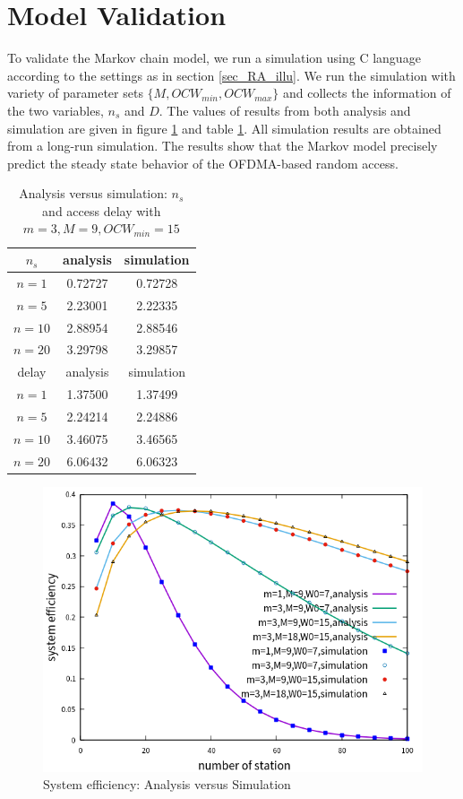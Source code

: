 \section{Model Validation} 		\label{sec_model_val}
To validate the Markov chain model, we run a simulation using C language according to the settings as in section \ref{sec_RA_illu}. 
We run the simulation with variety of parameter sets $\lbrace M, OCW_{min}, OCW_{max}\rbrace$ and collects the information of the two variables, $n_s$ and $D$. 
The values of results from both analysis and simulation are given in figure \ref{validation} and table \ref{table_val}. 
All simulation results are obtained from a long-run simulation.
The results show that the Markov model precisely predict the steady state behavior of the OFDMA-based random access.
\begin{table}[!h]
\caption{Analysis versus simulation: $n_s$ and access delay with $m=3,M=9,OCW_{min} = 15$}
\label{table_val}
\begin{center}
\begin{tabular}{c|c|c}
\hline
$n_s$ 	& analysis 	& simulation \\
\hline
$n=1$ 	& 0.72727  	& 0.72728 \\
$n=5$ 	& 2.23001	& 2.22335 \\
$n=10$	& 2.88954	& 2.88546 \\
$n=20$	& 3.29798	& 3.29857 \\
\hline
delay	& analysis	& simulation \\
\hline
$n=1$ 	& 1.37500  	& 1.37499 \\
$n=5$ 	& 2.24214	& 2.24886 \\
$n=10$	& 3.46075	& 3.46565 \\
$n=20$	& 6.06432	& 6.06323 \\
\hline
\end{tabular}
\end{center}
\end{table}

\begin{figure}[!h]
    \centering
\includegraphics[scale=0.74]{./figure/chp3/multiple_parameter.png}
\caption{System efficiency: Analysis versus Simulation}
\label{validation}
\end{figure}

